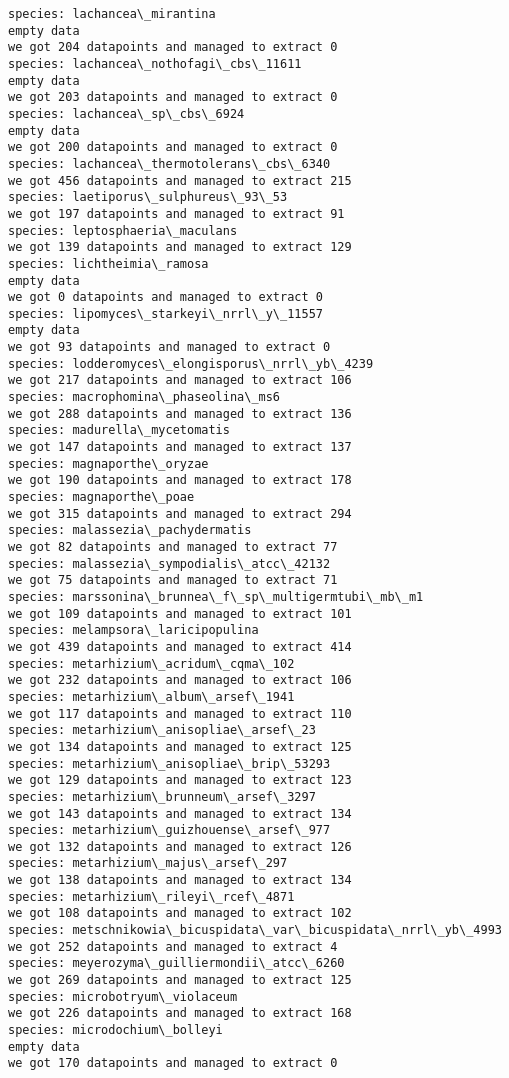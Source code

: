 \documentclass[11pt]{article}
\begin{document}
\begin{Verbatim}[commandchars=\\\{\}]
species: lachancea\_mirantina
empty data
we got 204 datapoints and managed to extract 0
species: lachancea\_nothofagi\_cbs\_11611
empty data
we got 203 datapoints and managed to extract 0
species: lachancea\_sp\_cbs\_6924
empty data
we got 200 datapoints and managed to extract 0
species: lachancea\_thermotolerans\_cbs\_6340
we got 456 datapoints and managed to extract 215
species: laetiporus\_sulphureus\_93\_53
we got 197 datapoints and managed to extract 91
species: leptosphaeria\_maculans
we got 139 datapoints and managed to extract 129
species: lichtheimia\_ramosa
empty data
we got 0 datapoints and managed to extract 0
species: lipomyces\_starkeyi\_nrrl\_y\_11557
empty data
we got 93 datapoints and managed to extract 0
species: lodderomyces\_elongisporus\_nrrl\_yb\_4239
we got 217 datapoints and managed to extract 106
species: macrophomina\_phaseolina\_ms6
we got 288 datapoints and managed to extract 136
species: madurella\_mycetomatis
we got 147 datapoints and managed to extract 137
species: magnaporthe\_oryzae
we got 190 datapoints and managed to extract 178
species: magnaporthe\_poae
we got 315 datapoints and managed to extract 294
species: malassezia\_pachydermatis
we got 82 datapoints and managed to extract 77
species: malassezia\_sympodialis\_atcc\_42132
we got 75 datapoints and managed to extract 71
species: marssonina\_brunnea\_f\_sp\_multigermtubi\_mb\_m1
we got 109 datapoints and managed to extract 101
species: melampsora\_laricipopulina
we got 439 datapoints and managed to extract 414
species: metarhizium\_acridum\_cqma\_102
we got 232 datapoints and managed to extract 106
species: metarhizium\_album\_arsef\_1941
we got 117 datapoints and managed to extract 110
species: metarhizium\_anisopliae\_arsef\_23
we got 134 datapoints and managed to extract 125
species: metarhizium\_anisopliae\_brip\_53293
we got 129 datapoints and managed to extract 123
species: metarhizium\_brunneum\_arsef\_3297
we got 143 datapoints and managed to extract 134
species: metarhizium\_guizhouense\_arsef\_977
we got 132 datapoints and managed to extract 126
species: metarhizium\_majus\_arsef\_297
we got 138 datapoints and managed to extract 134
species: metarhizium\_rileyi\_rcef\_4871
we got 108 datapoints and managed to extract 102
species: metschnikowia\_bicuspidata\_var\_bicuspidata\_nrrl\_yb\_4993
we got 252 datapoints and managed to extract 4
species: meyerozyma\_guilliermondii\_atcc\_6260
we got 269 datapoints and managed to extract 125
species: microbotryum\_violaceum
we got 226 datapoints and managed to extract 168
species: microdochium\_bolleyi
empty data
we got 170 datapoints and managed to extract 0

\end{Verbatim}
\end{document}
